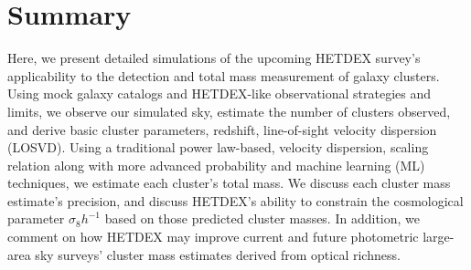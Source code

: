 \documentclass[fleqn,usenatbib]{mnras}
\begin{document}
\section{Summary}\label{sec:summary}
Here, we present detailed simulations of the upcoming HETDEX survey's applicability to the detection and total mass measurement of galaxy clusters. Using mock galaxy catalogs and HETDEX-like observational strategies and limits, we observe our simulated sky, estimate the number of clusters observed, and derive basic cluster parameters, redshift, line-of-sight velocity dispersion (LOSVD). Using a traditional power law-based, velocity dispersion, scaling relation along with more advanced probability and machine learning (ML) techniques, we estimate each cluster's total mass. We discuss each cluster mass estimate's precision, and discuss HETDEX's ability to constrain the cosmological parameter $\sigma_8 h^{-1}$ based on those predicted cluster masses. In addition, we comment on how HETDEX may improve current and future photometric large-area sky surveys' cluster mass estimates derived from optical richness.
\end{document}
